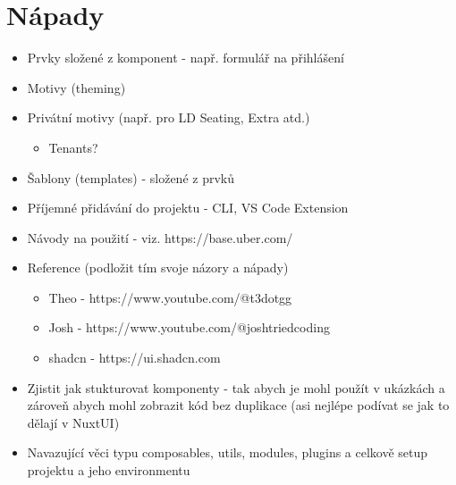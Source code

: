 
\chapter{Nápady}

\begin{itemize}
    \item Prvky složené z komponent - např. formulář na přihlášení
    \item Motivy (theming)
    \item Privátní motivy (např. pro LD Seating, Extra atd.)
    \begin{itemize}
        \item Tenants?
    \end{itemize}
    \item Šablony (templates) - složené z prvků
    \item Příjemné přidávání do projektu - CLI, VS Code Extension
    \item Návody na použití - viz. https://base.uber.com/
    \item Reference (podložit tím svoje názory a nápady)
    \begin{itemize}
        \item Theo - https://www.youtube.com/@t3dotgg
        \item Josh - https://www.youtube.com/@joshtriedcoding
        \item shadcn - https://ui.shadcn.com
    \end{itemize}
    \item Zjistit jak stukturovat komponenty - tak abych je mohl použít v ukázkách a zároveň abych mohl zobrazit kód bez duplikace (asi nejlépe podívat se jak to dělají v NuxtUI)
    \item Navazující věci typu composables, utils, modules, plugins a celkově setup projektu a jeho environmentu
\end{itemize}
